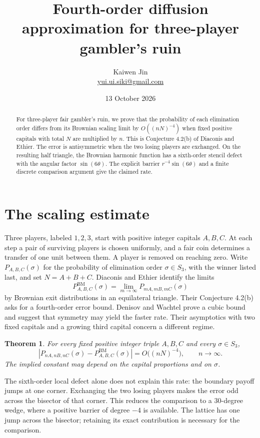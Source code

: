 \documentclass[11pt]{article}
\title{Fourth-order diffusion approximation for three-player gambler's ruin}
\author{Kaiwen Jin\\\small\href{mailto:yui.ui.siki@gmail.com}{yui.ui.siki@gmail.com}}
\date{13 October 2026}
\newtheorem{theorem}{Theorem}
\newcommand{\BM}{\mathrm{BM}}
\begin{document}
\maketitle
\begin{abstract}
For three-player fair gambler's ruin, we prove that the probability of each
elimination order differs from its Brownian scaling limit by
$O((nN)^{-4})$ when fixed positive capitals with total $N$ are multiplied
by $n$. This is Conjecture 4.2(b) of Diaconis and Ethier. The error is antisymmetric when the two losing players are exchanged.
On the resulting half triangle, the Brownian harmonic function has a
sixth-order stencil defect with the angular factor $\sin(6\theta)$. The explicit barrier
$r^{-4}\sin(6\theta)$ and a finite discrete comparison argument give the
claimed rate.
\end{abstract}

\section{The scaling estimate}

Three players, labeled $1,2,3$, start with positive integer capitals $A,B,C$.
At each step a pair of surviving players is chosen uniformly, and a fair coin
determines a transfer of one unit between them. A player is removed on reaching
zero. Write $P_{A,B,C}(\sigma)$ for the probability of elimination order
$\sigma\in S_3$, with the winner listed last, and set $N=A+B+C$.
Diaconis and Ethier \cite[Theorem 4.1]{DE} identify the limits
\[
 P^{\BM}_{A,B,C}(\sigma)=\lim_{m\to\infty}P_{mA,mB,mC}(\sigma)
\]
by Brownian exit distributions in an equilateral triangle. Their
Conjecture 4.2(b) asks for a fourth-order error bound.
Denisov and Wachtel \cite[Proposition 5]{DW} prove a cubic bound and suggest
that symmetry may yield the faster rate. Their asymptotics with two fixed
capitals and a growing third capital concern a different regime.

\begin{theorem}\label{thm:main}
For every fixed positive integer triple $A,B,C$ and every $\sigma\in S_3$,
\[
 \left|P_{nA,nB,nC}(\sigma)-P^{\BM}_{A,B,C}(\sigma)\right|
 =O\bigl((nN)^{-4}\bigr),\qquad n\to\infty.
\]
The implied constant may depend on the capital proportions and on $\sigma$.
\end{theorem}

The sixth-order local defect alone does not explain this rate: the boundary
payoff jumps at one corner. Exchanging the two losing players makes the error
odd across the bisector of that corner. This reduces the comparison to a
$30$-degree wedge, where a positive barrier of degree $-4$ is available.
The lattice has one jump across the bisector; retaining its exact contribution
is necessary for the comparison.
\end{document}
